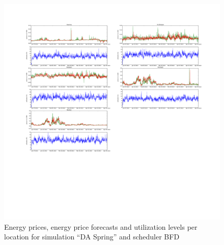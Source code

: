 \begin{figure}[htbp]
	\centering
	\vspace*{-0.6in}
	\hspace*{-1.4in}
		\includegraphics[width=1.60\textwidth]{figures/appendix_simulation_results/DA_Spring_scenario_1.pdf}
	\vspace*{-2.8in}
	\caption{Energy prices, energy price forecasts and utilization levels per location for simulation ``DA Spring'' and scheduler BFD}
	\label{fig:app_DA_Spring_scenario_1}
\end{figure}

